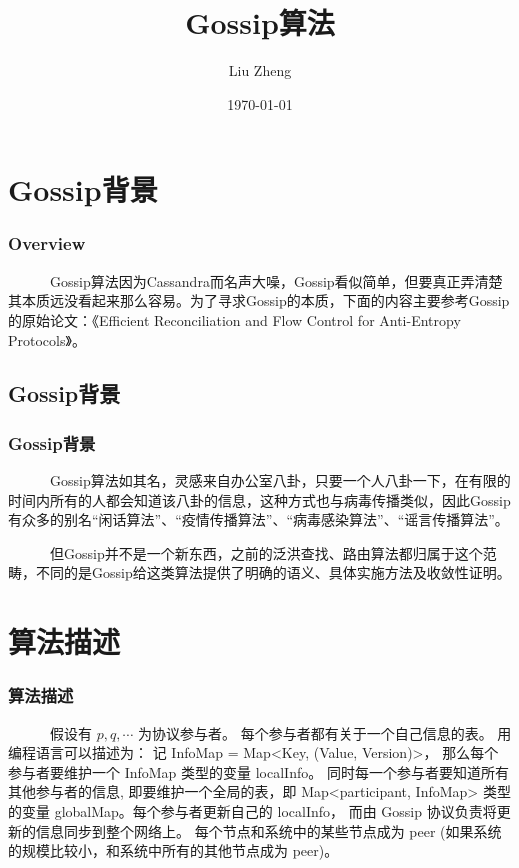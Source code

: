 \documentclass[slidestop,compress,mathserif,c]{beamer}
\title{Gossip算法}
\author{Liu Zheng}
\date{\today}
\institute{同济大学电信学院}
\begin{document}
\frame{\titlepage}

\section{Gossip背景}

\begin{frame}
\frametitle{Overview}
~~~~~~Gossip算法因为Cassandra而名声大噪，Gossip看似简单，但要真正弄清楚其本质远没看起来那么容易。为了寻求Gossip的本质，下面的内容主要参考Gossip的原始论文：《Efficient Reconciliation and Flow Control for Anti-Entropy Protocols》。
\end{frame}

\subsection{\hfill  Gossip背景}
\begin{frame}
\frametitle{Gossip背景}
~~~~~~Gossip算法如其名，灵感来自办公室八卦，只要一个人八卦一下，在有限的时间内所有的人都会知道该八卦的信息，这种方式也与病毒传播类似，因此Gossip有众多的别名“闲话算法”、“疫情传播算法”、“病毒感染算法”、“谣言传播算法”。

~~~~~~但Gossip并不是一个新东西，之前的泛洪查找、路由算法都归属于这个范畴，不同的是Gossip给这类算法提供了明确的语义、具体实施方法及收敛性证明。
\end{frame}
\section{算法描述}

\begin{frame}
\frametitle{算法描述}
~~~~~~假设有 ${p, q, \cdots}$ 为协议参与者。 每个参与者都有关于一个自己信息的表。
用编程语言可以描述为： 
记 InfoMap = Map<Key, (Value, Version)>， 那么每个参与者要维护一个 InfoMap 类型的变量 localInfo。 同时每一个参与者要知道所有其他参与者的信息, 即要维护一个全局的表，即 Map<participant, InfoMap> 类型的变量 globalMap。每个参与者更新自己的 localInfo， 而由 Gossip 协议负责将更新的信息同步到整个网络上。
每个节点和系统中的某些节点成为 peer (如果系统的规模比较小，和系统中所有的其他节点成为 peer)。 
\end{frame}
\end{document}
